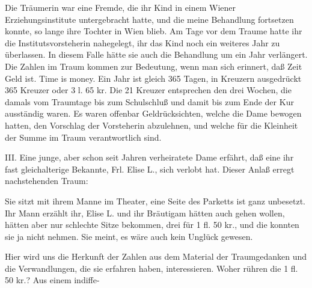 \documentclass[twoside=true,titlepage=false,open=any, parskip=never, fontsize=10pt, headings=small, chapterprefix=false, appendixprefix=false]{scrbook}
\begin{document}
            
        \pstart
        Die Träumerin war eine Fremde, die ihr Kind in einem Wiener Erziehungsinstitute
               untergebracht hatte, und die meine Behandlung fortsetzen konnte, so lange ihre
               Tochter in Wien blieb. Am Tage vor dem Traume hatte ihr die Institutsvorsteherin nahegelegt, ihr das Kind noch ein weiteres Jahr zu
               überlassen. In diesem Falle hätte sie auch die Behandlung um ein Jahr
               verlängert. Die Zahlen im Traum kommen zur Bedeutung, wenn man sich
               erinnert, daß Zeit Geld ist. Time is money.
               Ein Jahr ist gleich 365 Tagen, in Kreuzern ausgedrückt 365 Kreuzer oder 3 l. 65 kr. Die 21 Kreuzer entsprechen den
               drei Wochen, die damals vom Traumtage bis zum
               Schulschluß und damit bis zum Ende der Kur ausständig waren. Es waren
               offenbar Geldrücksichten, welche die Dame bewogen hatten, den Vorschlag der
               Vorsteherin abzulehnen, und welche für die Kleinheit der Summe im
               Traum verantwortlich sind.
        \pend
    
            
        \pstart
        III. Eine junge, aber schon seit Jahren verheiratete Dame erfährt, daß eine ihr
               fast gleichalterige Bekannte, Frl. Elise L., sich verlobt hat. Dieser Anlaß
               erregt nachstehenden Traum:
        \pend
    
            
        \pstart
        Sie sitzt mit ihrem Manne im Theater, eine Seite des Parketts ist
                  ganz unbesetzt. Ihr Mann erzählt ihr, Elise L. und ihr Bräutigam hätten auch gehen
                  wollen, hätten aber nur schlechte Sitze bekommen, drei für 1 ﬂ. 50 kr., und die
                  konnten sie ja nicht nehmen. Sie meint, es wäre auch kein Unglück
               gewesen.
        \pend
    
            
        \pstart
        Hier wird uns die Herkunft der Zahlen aus dem Material der Traumgedanken und die
               Verwandlungen, die sie erfahren haben, interessieren. Woher rühren die 1 fl. 50 kr.? Aus einem indiffe-
        \pend
    
         
            
            
            
\end{document}
